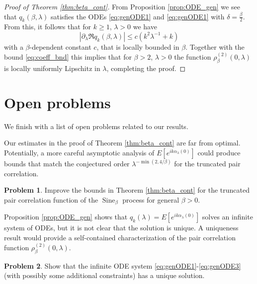 \documentclass[12pt]{article}
\theoremstyle{definition} %
\newtheorem{problem}{Problem}
\newcommand{\R}{{\mathbb R}}
\theoremstyle{remark} %
\newcommand{\Sineb}{\operatorname{Sine}_{\beta}}
\newcommand{\benedek}[1]{\textcolor{red}{\tt{#1}}}
\newcommand{\yahui}[1]{\textcolor{blue}{\tt{#1}}}
\begin{document}
\begin{proof}[Proof of Theorem \ref{thm:beta_cont}]
From Proposition \ref{prop:ODE_gen} we see that $q_k(\beta,\lambda)$ satisfies the ODEs \eqref{eq:genODE1} and \eqref{eq:genODE1} with $\delta=\frac{\beta}{2}$. From this, it follows that for $k\ge 1$, $\lambda>0$ we have
\[
|\partial_\lambda \Re q_k(\beta,\lambda)|\le c(k^2 \lambda^{-1}+k)
\]
with a $\beta$-dependent constant $c$, that is locally bounded in $\beta$. Together with the bound \eqref{eq:coeff_bnd} this implies that for $\beta>2$, $\lambda>0$ the function $ \rho_\beta^{(2)}(0,\lambda)$ is locally uniformly Lipschitz in $\lambda$, completing the proof. 
\end{proof}


\section{Open problems} \label{sec:open}

We finish with a list of open problems related to our results. \medskip


Our estimates in the proof of   Theorem \ref{thm:beta_cont} are far from optimal. Potentially,  a more careful asymptotic analysis of $E[e^{i k \alpha_\lambda(0)}]$ could produce bounds that match the conjectured order $\lambda^{-\min(2,4/\beta)}$  for the truncated pair correlation.  
\begin{problem}
  Improve the bounds in Theorem \ref{thm:beta_cont} for the truncated pair correlation function of the $\Sineb$ process for general $\beta>0$.
\end{problem}


Proposition \ref{prop:ODE_gen} shows that $q_k(\lambda)=E[e^{i k \alpha_\lambda(0)}]$ solves an infinite system of ODEs, but it is not clear that the solution is unique. A uniqueness result would provide a self-contained characterization of the pair correlation function $\rho_{\beta}^{(2)}(0,\lambda)$. 


\begin{problem}
Show that the infinite ODE system \eqref{eq:genODE1}-\eqref{eq:genODE3}  (with possibly some additional constraints) has a unique solution.
\end{problem}
\end{document}
